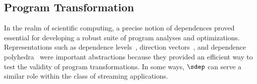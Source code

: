 \subsection{Program Transformation}

In the realm of scientific computing, a precise notion of dependences
proved essential for developing a robust suite of program analyses and
optimizations.  Representations such as dependence levels~\cite{AK82},
direction vectors~\cite{wolfe82}, and dependence
polyhedra~\cite{Irig88} were important abstractions because they
provided an efficient way to test the validity of program
transformations.  In some ways, $\sdep$ can serve a similar role
within the class of streaming applications.
